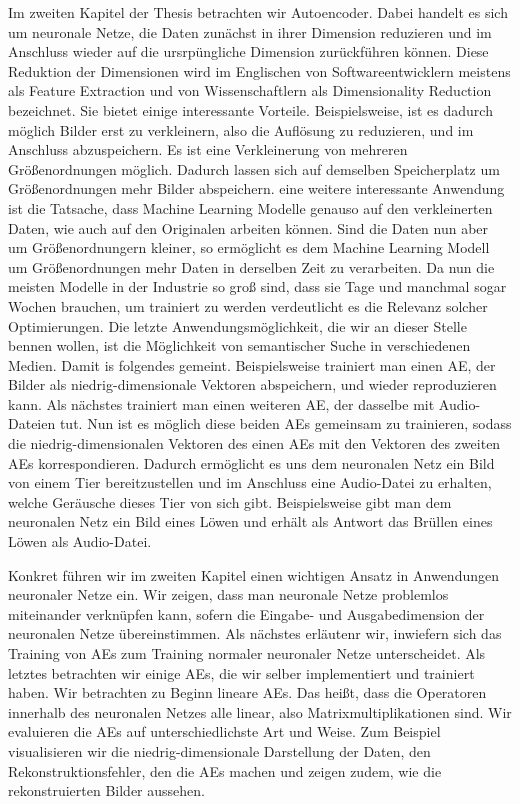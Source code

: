 \documentclass[11pt, twoside, a4paper]{book}
\theoremstyle{plain}
\theoremstyle{definition}
\theoremstyle{plain}
\begin{document}
Im zweiten Kapitel der Thesis betrachten wir Autoencoder. Dabei handelt es sich um neuronale Netze, die Daten zunächst in ihrer Dimension reduzieren und im Anschluss wieder auf die ursrpüngliche Dimension zurückführen können. Diese Reduktion der Dimensionen wird im Englischen von Softwareentwicklern meistens als \glqq Feature Extraction\grqq{} und von Wissenschaftlern als \glqq Dimensionality Reduction\grqq{} bezeichnet. Sie bietet einige interessante Vorteile. Beispielsweise, ist es dadurch möglich Bilder erst zu verkleinern, also die Auflösung zu reduzieren, und im Anschluss abzuspeichern. Es ist eine Verkleinerung von mehreren Größenordnungen möglich. Dadurch lassen sich auf demselben Speicherplatz um Größenordnungen mehr Bilder abspeichern. eine weitere interessante Anwendung ist die Tatsache, dass Machine Learning Modelle genauso auf den \glqq verkleinerten\grqq{} Daten, wie auch auf den Originalen arbeiten können. Sind die Daten nun aber um Größenordnungern kleiner, so ermöglicht es dem Machine Learning Modell um Größenordnungen mehr Daten in derselben Zeit zu verarbeiten. Da nun die meisten Modelle in der Industrie so groß sind, dass sie Tage und manchmal sogar Wochen brauchen, um trainiert zu werden verdeutlicht es die Relevanz solcher Optimierungen. Die letzte Anwendungsmöglichkeit, die wir an dieser Stelle bennen wollen, ist die Möglichkeit von semantischer Suche in verschiedenen Medien. Damit is folgendes gemeint. Beispielsweise trainiert man einen AE, der Bilder als niedrig-dimensionale Vektoren abspeichern, und wieder reproduzieren kann. Als nächstes trainiert man einen weiteren AE, der dasselbe mit Audio-Dateien tut. Nun ist es möglich diese beiden AEs gemeinsam zu trainieren, sodass die niedrig-dimensionalen Vektoren des einen AEs mit den Vektoren des zweiten AEs korrespondieren. Dadurch ermöglicht es uns dem neuronalen Netz ein Bild von einem Tier bereitzustellen und im Anschluss eine Audio-Datei zu erhalten, welche Geräusche dieses Tier von sich gibt. Beispielsweise gibt man dem neuronalen Netz ein Bild eines Löwen und erhält als Antwort das Brüllen eines Löwen als Audio-Datei.

Konkret führen wir im zweiten Kapitel einen wichtigen Ansatz in Anwendungen neuronaler Netze ein. Wir zeigen, dass man neuronale Netze problemlos miteinander verknüpfen kann, sofern die Eingabe- und Ausgabedimension der neuronalen Netze übereinstimmen. Als nächstes erläutenr wir, inwiefern sich das Training von AEs zum Training normaler neuronaler Netze unterscheidet. Als letztes betrachten wir einige AEs, die wir selber implementiert und trainiert haben. Wir betrachten zu Beginn lineare AEs. Das heißt, dass die Operatoren innerhalb des neuronalen Netzes alle linear, also Matrixmultiplikationen sind. Wir evaluieren die AEs auf unterschiedlichste Art und Weise. Zum Beispiel visualisieren wir die niedrig-dimensionale Darstellung der Daten, den Rekonstruktionsfehler, den die AEs machen und zeigen zudem, wie die rekonstruierten Bilder aussehen.
\end{document}
